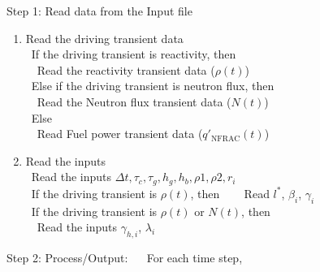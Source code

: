 \noindent Step 1: Read data from the Input file

\begin{enumerate}

\item Read the driving transient data
  \\
  \indent \ If the driving transient is reactivity, then
  \\
  \indent \ \ Read the reactivity transient data ($\rho(t)$)
  \\
  \indent
  \ Else if the driving transient is neutron flux, then\\
  \indent \ \ Read the Neutron flux transient data ($N(t)$)
  \\
  \indent
  \ Else \\
  \indent \ \ Read Fuel power transient data ($q'_{\text{NFRAC}}(t)$)

\item Read the inputs\\
  \indent \ Read the inputs $\Delta t,\tau_c,\tau_g,h_g,h_b,\rho 1,\rho2,r_i$
  \\
  \indent \ If the driving transient is $\rho(t)$, then ~\newline
  \indent \ \  Read $l^*$, $\beta_i$, $\gamma_i$ \\
  \indent \  If the driving transient is $\rho(t)$ or $N(t)$, then\\
  \indent \ \ Read the inputs $\gamma_{h,i}$, $\lambda_i$
\end{enumerate}

\noindent Step 2: Process/Output:
~\newline 
\indent \ For each time step,

